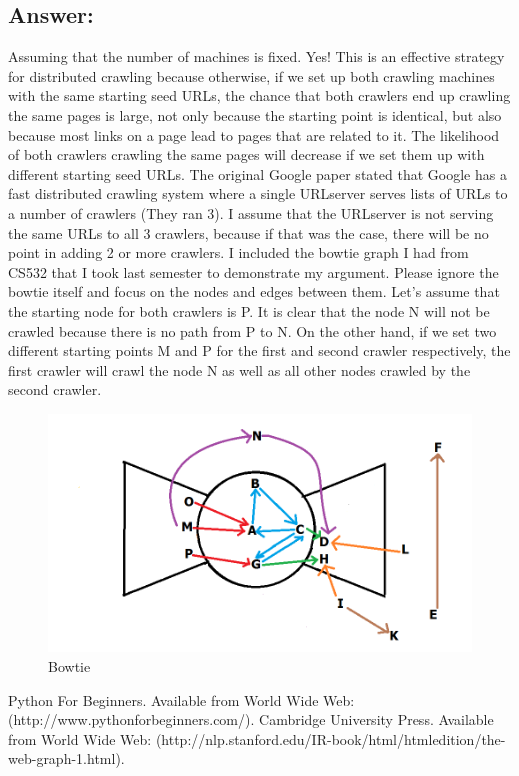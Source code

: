\documentclass[a4paper, 11pt]{article}
\begin{document}
\subsection*{Answer:}
Assuming that the number of machines is fixed. Yes! This is an effective strategy for distributed crawling because otherwise, if we set up both crawling machines with the same starting seed URLs, the chance that both crawlers end up crawling the same pages is large, not only because the starting point is identical, but also because most links on a page lead to pages that are related to it. The likelihood of both crawlers crawling the same pages will decrease if we set them up with different starting seed URLs. The original Google paper stated that Google has a fast distributed crawling system where a single URLserver serves lists of URLs to a number of crawlers (They ran 3). I assume that the URLserver is not serving the same URLs to all 3 crawlers, because if that was the case, there will be no point in adding 2 or more crawlers. I included the bowtie graph I had from CS532 that I took last semester to demonstrate my argument. Please ignore the bowtie itself and focus on the nodes and edges between them. Let's assume that the starting node for both crawlers is P. It is clear that the node N will not be crawled because there is no path from P to N. On the other hand, if we set two different starting points M and P for the first and second crawler respectively, the first crawler will crawl the node N as well as all other nodes crawled by the second crawler.

\begin{figure}[h]
\caption{Bowtie}
\centering
\includegraphics[scale=0.5]{Q2/bowtie.png}
\end{figure}

\begin{thebibliography}{9}
 Python For Beginners. Available from World Wide Web:(http://www.pythonforbeginners.com/).
 Cambridge University Press. Available from World Wide Web: (http://nlp.stanford.edu/IR-book/html/htmledition/the-web-graph-1.html).
\end{thebibliography}
\end{document}
